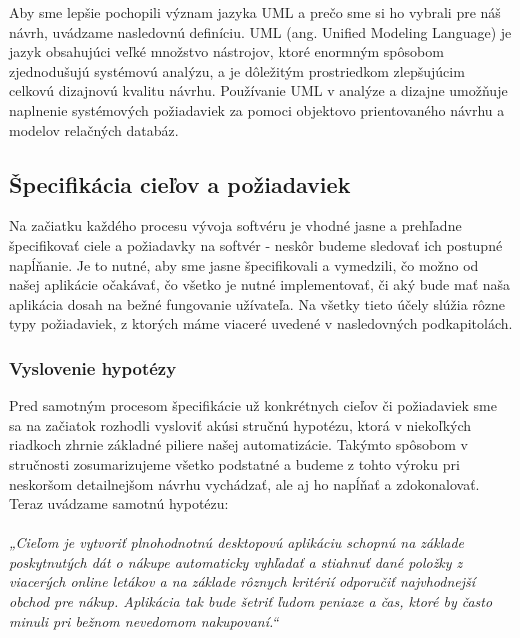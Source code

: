 \documentclass[twoside,slovak, a4paper]{article}
\begin{document}
Aby sme lepšie pochopili význam jazyka UML a prečo sme si ho vybrali pre náš návrh, uvádzame nasledovnú definíciu. UML (ang. Unified Modeling Language) je jazyk obsahujúci veľké množstvo nástrojov, ktoré enormným spôsobom zjednodušujú systémovú analýzu, a je dôležitým prostriedkom zlepšujúcim celkovú dizajnovú kvalitu návrhu. Používanie UML v analýze a dizajne umožňuje naplnenie systémových požiadaviek za pomoci objektovo prientovaného návrhu a modelov relačných databáz.\cite{CAVIQUE2022103569}


\subsection{Špecifikácia cieľov a požiadaviek}

Na začiatku každého procesu vývoja softvéru je vhodné jasne a prehľadne špecifikovať ciele a požiadavky na softvér - neskôr budeme sledovať ich postupné napĺňanie. Je to nutné, aby sme jasne špecifikovali a vymedzili, čo možno od našej aplikácie očakávať, čo všetko je nutné implementovať, či aký bude mať naša aplikácia dosah na bežné fungovanie užívateľa. Na všetky tieto účely slúžia rôzne typy požiadaviek, z ktorých máme viaceré uvedené v nasledovných podkapitolách.

\subsubsection*{Vyslovenie hypotézy}

Pred samotným procesom špecifikácie už konkrétnych cieľov či požiadaviek sme sa na začiatok rozhodli vysloviť akúsi stručnú hypotézu, ktorá v niekoľkých riadkoch zhrnie základné piliere našej automatizácie. Takýmto spôsobom v stručnosti zosumarizujeme všetko podstatné a budeme z tohto výroku pri neskoršom detailnejšom návrhu vychádzať, ale aj ho napĺňať a zdokonalovať. Teraz uvádzame samotnú hypotézu:

\paragraph{}

\textit{„Cieľom je vytvoriť plnohodnotnú desktopovú aplikáciu schopnú na základe poskytnutých dát o nákupe automaticky vyhľadať a stiahnuť dané položky z viacerých online letákov a na základe rôznych kritérií odporučiť najvhodnejší obchod pre nákup. Aplikácia tak bude šetriť ľudom peniaze a čas, ktoré by často minuli pri bežnom nevedomom nakupovaní.“}

\paragraph{}
\end{document}
